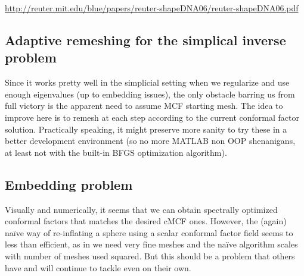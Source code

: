 \documentclass[11pt]{article}
\theoremstyle{definition}
\begin{document}
\url{http://reuter.mit.edu/blue/papers/reuter-shapeDNA06/reuter-shapeDNA06.pdf}

\subsection{Adaptive remeshing for the simplical inverse problem}
Since it works pretty well in the simplicial setting when we regularize and use enough eigenvalues (up to embedding issues), the only obstacle barring us from full victory is the apparent need to assume MCF starting mesh. The idea to improve here is to remesh at each step according to the current conformal factor solution. Practically speaking, it might preserve more sanity to try these in a better development environment (so no more MATLAB non OOP shenanigans, at least not with the built-in BFGS optimization algorithm).

\subsection{Embedding problem}
Visually and numerically, it seems that we can obtain spectrally optimized conformal factors that matches the desired cMCF ones. However, the (again) na\"ive way of re-inflating a sphere using a scalar conformal factor field seems to less than efficient, as in we need very fine meshes and the na\"ive algorithm scales with number of meshes used squared. But this should be a problem that others have and will continue to tackle even on their own.
\end{document}

